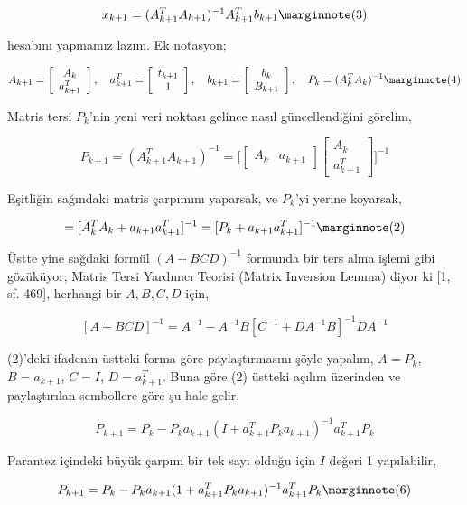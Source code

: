 \documentclass[12pt,fleqn]{article}\usepackage{../../common}
\begin{document}
$$ 
x_{k+1} = (A_{k+1}^TA_{k+1})^{-1}A_{k+1}^T b_{k+1} 
\mlabel{3} 
$$

hesabını yapmamız lazım. Ek notasyon;

$$ 
A_{k+1} = \left[\begin{array}{c}
A_k \\ a_{k+1}^T
\end{array}\right], \quad
a_{k+1}^T = \left[\begin{array}{c}
t_{k+1} \\ 1
\end{array}\right], \quad 
b_{k+1} = \left[\begin{array}{c}
b_k \\ B_{k+1}
\end{array}\right], \quad 
P_k = (A_k^TA_k)^{-1}
\mlabel{4}
 $$

Matris tersi $P_k$'nin yeni veri noktası gelince nasıl güncellendiğini
görelim, 

$$ 
P_{k+1} = (A_{k+1}^TA_{k+1})^{-1} = 
\bigg[
\left[\begin{array}{cc}A_k & a_{k+1} \end{array}\right]
\left[\begin{array}{c}A_k \\ a_{k+1}^T \end{array}\right]
\bigg]^{-1}
$$

Eşitliğin sağındaki matris çarpımını yaparsak, ve $P_k$'yi yerine koyarsak,

$$ = [ A_k^TA_k + a_{k+1}a_{k+1}^T ]^{-1} 
= [ P_k + a_{k+1}a_{k+1}^T ]^{-1} 
\mlabel{2}
$$

Üstte yine sağdaki formül $(A+BCD)^{-1}$ formunda bir ters alma işlemi gibi
gözüküyor; Matris Tersi Yardımcı Teorisi (Matrix Inversion Lemma) diyor ki
[1, sf. 469], herhangi bir $A,B,C,D$ için,

$$ [A + BCD]^{-1} = A^{-1} - A^{-1}B[C^{-1} + DA^{-1} B]^{-1} DA^{-1} $$

(2)'deki ifadenin üstteki forma göre paylaştırmasını şöyle yapalım, 
$A = P_k$, $B = a_{k+1}$, $C=I$, $D=a_{k+1}^T$. Buna göre (2) üstteki 
açılım üzerinden ve paylaştırılan sembollere göre şu hale gelir,

$$ P_{k+1} = P_k - P_k a_{k+1}(I + a_{k+1}^T P_k a_{k+1})^{-1} a_{k+1}^TP_k  $$

Parantez içindeki büyük çarpım bir tek sayı olduğu için $I$ değeri 1
yapılabilir,

$$ P_{k+1} = P_k - P_k a_{k+1}(1 + a_{k+1}^T P_k a_{k+1})^{-1} a_{k+1}^TP_k  
\mlabel{6}
$$
\end{document}
